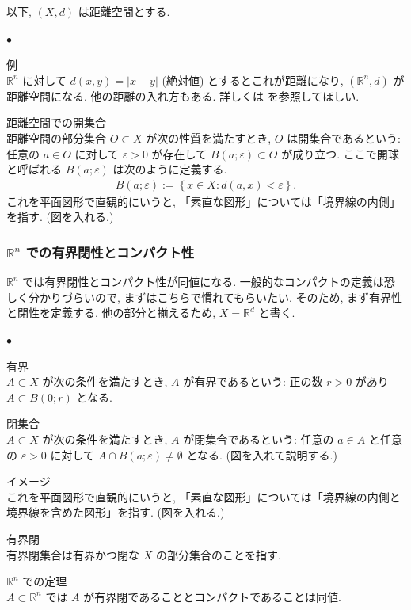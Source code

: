 \documentclass[openany, a4paper, oneside]{jsbook}
\newcounter{enum2}
\renewenvironment{itemize}{%
\begin{list}{$\bullet$\ \ }%
{%
\usecounter{enum2}
\setlength{\itemindent}{0pt}%
\setlength{\leftmargin}{15pt}%
\setlength{\rightmargin}{0pt}%
\setlength{\labelsep}{0pt}%
\setlength{\labelwidth}{6pt}%
\setlength{\itemsep}{0pt}%
\setlength{\parsep}{0pt}%
\setlength{\listparindent}{0pt}%
}
}{%
\end{list}%
}
\theoremstyle{break}
\theoremstyle{breakdefn}
\begin{document}
以下, $(X, d)$ は距離空間とする.
\begin{itemize}

\item 例\\
%
$\mathbb{R}^n$ に対して $d (x, y) = \left| x - y \right|$ (絶対値) とするとこれが距離になり,
$(\mathbb{R}^n, d)$ が距離空間になる.
他の距離の入れ方もある.
詳しくは \cite{ShigeoIchiraku1, KazuoMatsuzaka1} を参照してほしい.

\item 距離空間での開集合\\
%
距離空間の部分集合 $O \subset X$ が次の性質を満たすとき, $O$ は開集合であるという:
任意の $a \in O$ に対して $\varepsilon > 0$ が存在して $B (a; \varepsilon) \subset O$ が成り立つ.
ここで開球と呼ばれる $B (a; \varepsilon)$ は次のように定義する.
\begin{align}
 B (a; \varepsilon)
 :=
 \left\{ x \in X : d (a, x) < \varepsilon \right\}.
\end{align}
これを平面図形で直観的にいうと, 「素直な図形」については「境界線の内側」を指す.
(図を入れる.)
\end{itemize} %
\subsubsection{$\mathbb{R}^n$ での有界閉性とコンパクト性}


$\mathbb{R}^n$ では有界閉性とコンパクト性が同値になる.
一般的なコンパクトの定義は恐しく分かりづらいので, まずはこちらで慣れてもらいたい.
そのため, まず有界性と閉性を定義する.
他の部分と揃えるため, $X = \mathbb{R}^d$ と書く.
\begin{itemize}

\item 有界\\
%
$A \subset X$ が次の条件を満たすとき, $A$ が有界であるという:
正の数 $r > 0$ があり $A \subset B (0; r)$ となる.

\item 閉集合\\
%
$A \subset X$ が次の条件を満たすとき, $A$ が閉集合であるという:
任意の $a \in A$ と任意の $\varepsilon > 0$ に対して $A \cap B (a; \varepsilon) \neq \emptyset$ となる.
(図を入れて説明する.)

\item イメージ\\
%
これを平面図形で直観的にいうと, 「素直な図形」については「境界線の内側と境界線を含めた図形」を指す.
(図を入れる.)

\item 有界閉\\
%
有界閉集合は有界かつ閉な $X$ の部分集合のことを指す.

\item $\mathbb{R}^n$ での定理\\
%
$A \subset \mathbb{R}^n$ では $A$ が有界閉であることとコンパクトであることは同値.
\end{itemize} %
\end{document}

